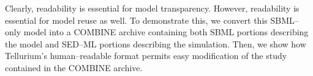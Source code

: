 \documentclass[10pt,letterpaper]{article}
\begin{document}
Clearly, readability is essential for model transparency. However, readability is essential for model reuse as well. To demonstrate this, we convert this SBML--only model into a COMBINE archive containing both SBML portions describing the model and SED--ML portions describing the simulation.  Then, we show how Tellurium's human--readable format permits easy modification of the study contained in the COMBINE archive.


\end{document}
